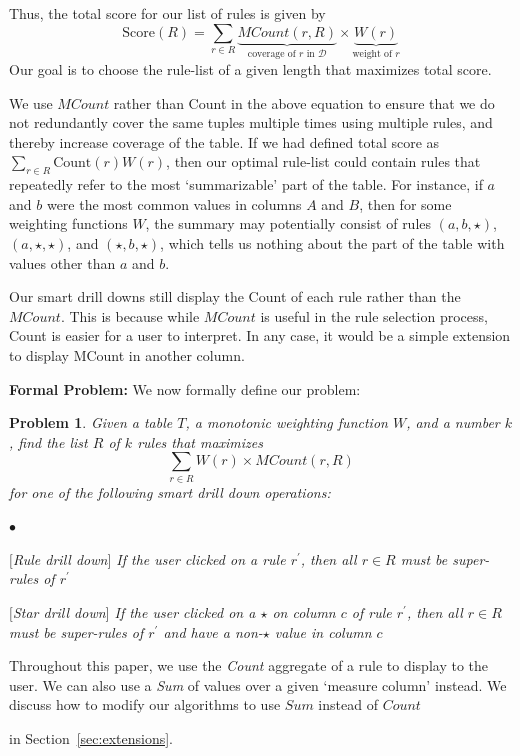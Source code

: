 \documentclass[10pt,journal,compsoc]{IEEEtran}
\newcounter{prob}
\newtheorem{problem}[prob]{Problem}
\newcommand{\stitle}[1]{\vspace{0.5em}\noindent\textbf{#1}}
\newcommand{\eat}[1]{}
\newcommand{\papertext}[1]{#1}
\newcommand{\calD}{\mathcal{D}\xspace}
\newenvironment{denselist}{
    \begin{list}{\small{$\bullet$}}%
    {\setlength{\itemsep}{0ex} \setlength{\topsep}{0ex}
    \setlength{\parsep}{0pt} \setlength{\itemindent}{0pt}
    \setlength{\leftmargin}{1.5em}
    \setlength{\partopsep}{0pt}}}%
    {\end{list}}
\begin{document}
Thus, the total score for our list of rules is given by 
$$\text{Score}(R) = \sum_{r \in R} \underbrace{MCount(r, R)}_{\text{coverage of $r$ in $\calD$}} \times \underbrace{W(r)}_{\text{weight of $r$}}$$ 
Our goal is to choose the rule-list of a given length that maximizes 
total score. 


We use $MCount$ rather than Count in the above equation to ensure that we do not redundantly cover
the same tuples multiple times using multiple rules, and thereby increase coverage of the table. 
If we had defined total score as $\sum_{r \in R} \text{Count}(r)W(r)$, then our optimal rule-list could 
contain rules that repeatedly refer to the most `summarizable' part of the table. 
For instance, if $a$ and $b$ were the most common values in columns $A$ and $B$, then 
for some weighting functions $W$, 
the summary may potentially consist of rules $(a, b, \star)$, $(a, \star, \star)$, and $(\star, b, \star)$, which tells us nothing about the part of the table with values other than $a$ and $b$. 

Our smart drill downs still display the Count of each rule rather than the $MCount$. This is because while $MCount$ is useful in the rule selection process, Count is easier for a user to interpret. In any case, it would be a simple extension to display MCount in another column.

\stitle{Formal Problem:} We now formally define our problem:
\begin{problem}\label{prob:optimal-subrule-list}
Given a table $T$, a monotonic weighting function $W$, and a number $k$, find the list $R$ of $k$ rules that maximizes 
$$\sum_{r \in R} W(r) \times MCount(r,R)$$
for one of the following smart drill down operations:
\begin{denselist}
\item $[$Rule drill down$]$ If the user clicked on a rule $r^{\prime}$, then all $r \in R$ must be super-rules of $r^{\prime}$
\item $[$Star drill down$]$ If the user clicked on a $\star$ on column $c$ of rule $r^{\prime}$, then all $r \in R$ must be super-rules of $r^{\prime}$ and have a non-$\star$ value in column $c$
\end{denselist}
\end{problem}
\noindent Throughout this paper, we use the {\em Count} aggregate of a rule to display to the user. We can also use a {\em Sum} of values over a given `measure column' instead. We discuss how to modify our algorithms to use $Sum$ instead of $Count$ 
\eat{in our technical report~\cite{tr}.}
\papertext{in Section~\ref{sec:extensions}.}
\end{document}
